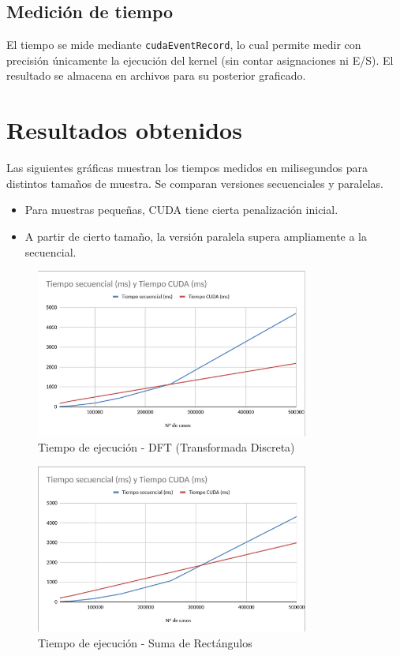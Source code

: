 \documentclass[12pt]{article}
\begin{document}
\subsection*{Medición de tiempo}

El tiempo se mide mediante \texttt{cudaEventRecord}, lo cual permite medir con precisión únicamente la ejecución del kernel (sin contar asignaciones ni E/S). El resultado se almacena en archivos para su posterior graficado.

\section*{Resultados obtenidos}

Las siguientes gráficas muestran los tiempos medidos en milisegundos para distintos tamaños de muestra. Se comparan versiones secuenciales y paralelas.

\begin{itemize}
    \item Para muestras pequeñas, CUDA tiene cierta penalización inicial.
    \item A partir de cierto tamaño, la versión paralela supera ampliamente a la secuencial.
\end{itemize}

\begin{figure}[h]
    \centering
    \includegraphics[width=0.8\textwidth]{captura1.png}
    \caption{Tiempo de ejecución - DFT (Transformada Discreta)}
\end{figure}

\begin{figure}[h]
    \centering
    \includegraphics[width=0.8\textwidth]{captura2.png}
    \caption{Tiempo de ejecución - Suma de Rectángulos}
\end{figure}
\end{document}
